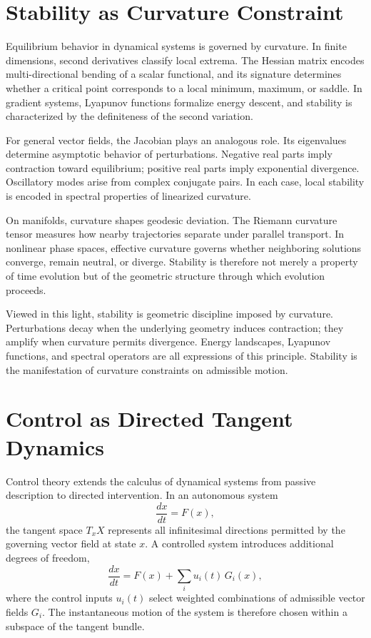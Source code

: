 \documentclass[12pt]{book}
\begin{document}
\section{Stability as Curvature Constraint}

Equilibrium behavior in dynamical systems is governed by curvature.
In finite dimensions, second derivatives classify local extrema.
The Hessian matrix encodes multi-directional bending of a scalar
functional, and its signature determines whether a critical point
corresponds to a local minimum, maximum, or saddle. In gradient
systems, Lyapunov functions formalize energy descent, and stability
is characterized by the definiteness of the second variation.

For general vector fields, the Jacobian plays an analogous role.
Its eigenvalues determine asymptotic behavior of perturbations.
Negative real parts imply contraction toward equilibrium;
positive real parts imply exponential divergence. Oscillatory
modes arise from complex conjugate pairs. In each case, local
stability is encoded in spectral properties of linearized curvature.

On manifolds, curvature shapes geodesic deviation. The Riemann
curvature tensor measures how nearby trajectories separate under
parallel transport. In nonlinear phase spaces, effective curvature
governs whether neighboring solutions converge, remain neutral,
or diverge. Stability is therefore not merely a property of time
evolution but of the geometric structure through which evolution
proceeds.

Viewed in this light, stability is geometric discipline imposed
by curvature. Perturbations decay when the underlying geometry
induces contraction; they amplify when curvature permits divergence.
Energy landscapes, Lyapunov functions, and spectral operators are
all expressions of this principle. Stability is the manifestation
of curvature constraints on admissible motion.

\section{Control as Directed Tangent Dynamics}

Control theory extends the calculus of dynamical systems from passive
description to directed intervention. In an autonomous system
\[
\frac{dx}{dt} = F(x),
\]
the tangent space $T_x X$ represents all infinitesimal directions
permitted by the governing vector field at state $x$. A controlled
system introduces additional degrees of freedom,
\[
\frac{dx}{dt} = F(x) + \sum_{i} u_i(t)\, G_i(x),
\]
where the control inputs $u_i(t)$ select weighted combinations of
admissible vector fields $G_i$. The instantaneous motion of the system
is therefore chosen within a subspace of the tangent bundle.
\end{document}

